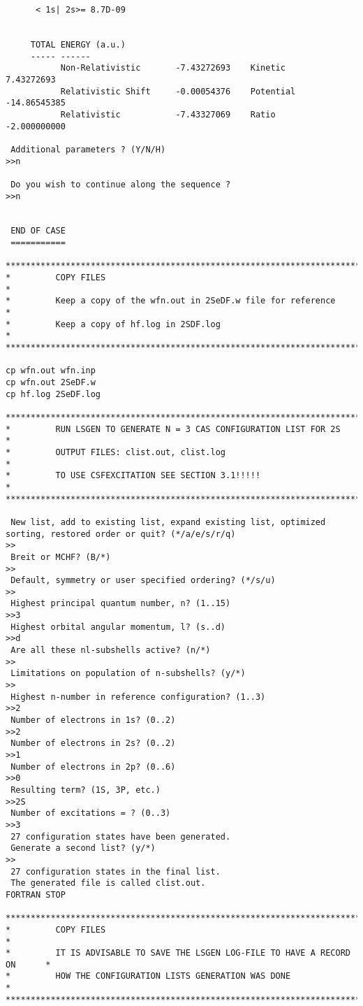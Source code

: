 \documentclass[fleqn,10pt]{book}
\begin{document}
\begin{verbatim}
      < 1s| 2s>= 8.7D-09


     TOTAL ENERGY (a.u.)
     ----- ------
           Non-Relativistic       -7.43272693    Kinetic        7.43272693
           Relativistic Shift     -0.00054376    Potential    -14.86545385
           Relativistic           -7.43327069    Ratio        -2.000000000

 Additional parameters ? (Y/N/H)
>>n

 Do you wish to continue along the sequence ?
>>n


 END OF CASE
 ===========
 
*******************************************************************************
*         COPY FILES                                                          *
*         Keep a copy of the wfn.out in 2SeDF.w file for reference            *
*         Keep a copy of hf.log in 2SDF.log                                   *
*******************************************************************************

cp wfn.out wfn.inp
cp wfn.out 2SeDF.w
cp hf.log 2SeDF.log

*******************************************************************************
*         RUN LSGEN TO GENERATE N = 3 CAS CONFIGURATION LIST FOR 2S           *
*         OUTPUT FILES: clist.out, clist.log                                  *
*         TO USE CSFEXCITATION SEE SECTION 3.1!!!!!                           *
*******************************************************************************

 New list, add to existing list, expand existing list, optimized sorting, restored order or quit? (*/a/e/s/r/q)
>>
 Breit or MCHF? (B/*)
>>
 Default, symmetry or user specified ordering? (*/s/u)
>>
 Highest principal quantum number, n? (1..15)
>>3
 Highest orbital angular momentum, l? (s..d)
>>d
 Are all these nl-subshells active? (n/*)
>>
 Limitations on population of n-subshells? (y/*)
>>
 Highest n-number in reference configuration? (1..3)
>>2
 Number of electrons in 1s? (0..2)
>>2
 Number of electrons in 2s? (0..2)
>>1
 Number of electrons in 2p? (0..6)
>>0
 Resulting term? (1S, 3P, etc.)
>>2S
 Number of excitations = ? (0..3)
>>3
 27 configuration states have been generated.
 Generate a second list? (y/*)
>>
 27 configuration states in the final list.
 The generated file is called clist.out.
FORTRAN STOP

*******************************************************************************
*         COPY FILES                                                          *
*         IT IS ADVISABLE TO SAVE THE LSGEN LOG-FILE TO HAVE A RECORD ON      *
*         HOW THE CONFIGURATION LISTS GENERATION WAS DONE                     *
*******************************************************************************


\end{verbatim}
\end{document}
